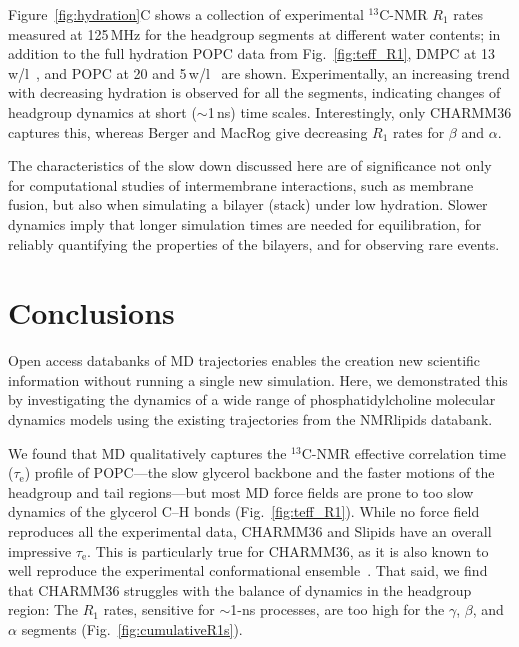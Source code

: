 \documentclass[journal=jcisd8,manuscript=article,layout=twocolumn]{achemso}
\begin{document}


Figure~\ref{fig:hydration}C shows
a collection of experimental $^{13}$C-NMR $R_1$ rates
measured at 125\,MHz for the headgroup segments
at different water contents;
in addition to the full hydration POPC data from Fig.~\ref{fig:teff_R1},
DMPC at 13\,w/l~\cite{pham15}, %
and POPC at 20 and 5\,w/l~\cite{Volke:1995a} %
are shown.
%
Experimentally, an increasing trend with decreasing hydration is observed for all the segments,
indicating changes of headgroup dynamics at short ($\sim$1\,ns) time scales.
Interestingly, only CHARMM36 captures this,
whereas Berger and MacRog give decreasing $R_1$ rates for $\beta$ and $\alpha$.
%

The characteristics of the slow down discussed here are of significance
not only for computational studies of inter\-membrane interactions, such as membrane fusion,  but also when simulating a bilayer (stack) under low hydration. Slower dynamics imply that longer simulation times are needed for equilibration, for reliably quantifying the properties of the bilayers, and for observing rare events. %

\section{Conclusions}
Open access databanks of MD trajectories enables the creation new scientific information without running a single new simulation. Here,
we demonstrated this by investigating the dynamics of a wide range of phosphatidylcholine molecular dynamics models using the existing trajectories from the NMRlipids databank.

We found that MD qualitatively captures the $^{13}$C-NMR effective correlation time ($\tau_\mathrm e$) profile of POPC---the slow glycerol backbone and the faster motions of the headgroup and tail regions---but most MD force fields are prone to too slow dynamics of the glycerol C--H bonds (Fig.~\ref{fig:teff_R1}).
%
While no force field reproduces all the experimental data,
CHARMM36 and Slipids have an overall impressive $\tau_\mathrm e$.
This is particularly true for CHARMM36, as it is also known to
well reproduce the experimental conformational ensemble~\cite{botan15}.
%
That said, we find that CHARMM36 struggles with the balance of dynamics in the headgroup region:
The $R_1$ rates, sensitive for $\sim$1-ns processes, are too high for the $\gamma$, $\beta$, and $\alpha$ segments (Fig.~\ref{fig:cumulativeR1s}).
\end{document}
